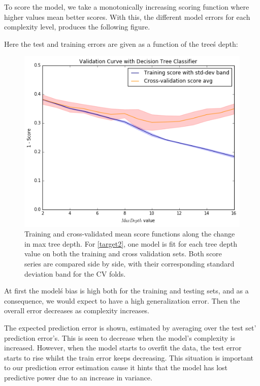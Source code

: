 To score the model, we take a monotonically increasing scoring function where
higher values mean better scores.
With this, the different model errors for each complexity level, produces the following figure.

Here the test and training errors are given as a function of the tree\'s depth:



\begin{figure}[h!]
\begin{center}
\includegraphics[width=0.7\columnwidth]{figures/figure-biasVariance/dtree_overfit_problem_2.png}
\caption{ Training and cross-validated mean score functions along the change in max tree depth.
For \cref{target2}, one model is fit for each tree depth value on both the training and cross validation sets.
Both score series are compared side by side, with their corresponding standard deviation band for the CV folds.}
\label{figure:dtree_overfit_problem_2}
\end{center}
\end{figure}


At first the model\'s bias is high both for the training and testing sets, and as a consequence, we would expect to have a high generalization error.
Then the overall error decreases as complexity increases.

The expected prediction error is shown, estimated by averaging over the test set' prediction error's.
This is seen to decrease when the model's complexity is increased.
However, when the model starts to overfit the data, the test error starts to rise whilst the train error keeps decreasing.
This situation is important to our prediction error estimation cause it hints that the model has lost predictive power due to an increase in variance.

